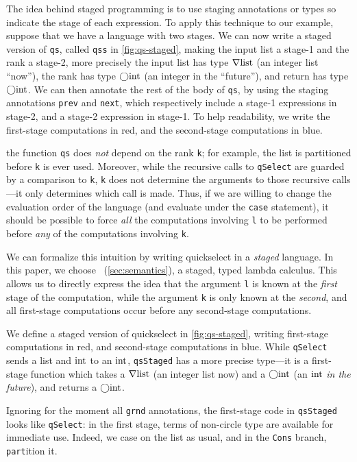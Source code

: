 \begin{abstrsyn}
The idea behind staged programming is to use staging annotations or
types so indicate the stage of each expression.  To apply this
technique to our example, suppose that we have a language with two
stages.  We can now write a staged version of \texttt{qs}, called
\texttt{qss} in \ref{fig:qs-staged}, making the input list a stage-1
and the rank a stage-2, more precisely the input list has type
$\nabla\mathrm{list}$ (an integer list ``now''), the rank has type
$\bigcirc{\rm int}$ (an integer in the ``future''), and return has type
$\bigcirc{\rm int}$.  We can then annotate the rest of the body of
\texttt{qs}, by using the staging annotations \texttt{prev} and
\texttt{next}, which respectively include a stage-1 expressions in
stage-2, and a stage-2 expression in stage-1.  To help readability, we
write the first-stage computations in red, and the second-stage
computations in blue.



the
function \texttt{qs} does \emph{not} depend on the rank \texttt{k};
for example, the list is partitioned before \texttt{k} is ever
used. Moreover, while the recursive calls to \texttt{qSelect} are
guarded by a comparison to \texttt{k}, \texttt{k} does not determine
the arguments to those recursive calls---it only determines which call
is made. Thus, if we are willing to change the evaluation order of the
language (and evaluate under the \texttt{case} statement), it should
be possible to force \emph{all} the computations involving \texttt{l}
to be performed before \emph{any} of the computations involving
\texttt{k}.

We can formalize this intuition by writing quickselect in a \emph{staged}
language. In this paper, we choose \lang\ (\ref{sec:semantics}), a staged, typed
lambda calculus. This allows us to directly express the idea that the argument
\texttt{l} is known at the \emph{first} stage of the computation, while the
argument \texttt{k} is only known at the \emph{second}, and all
first-stage computations occur before any second-stage computations.

We define a staged version of quickselect in \ref{fig:qs-staged}, writing
first-stage computations in red, and second-stage computations in blue. While
\texttt{qSelect} sends a \textrm{list} and ${\rm int}$ to an ${\rm int}$,
\texttt{qsStaged} has a more precise type---it is a first-stage function which
takes a $\nabla\mathrm{list}$ (an integer list now) and a $\bigcirc{\rm int}$
(an ${\rm int}$ \emph{in the future}), and returns a $\bigcirc{\rm int}$.

Ignoring for the moment all \texttt{grnd} annotations, the first-stage code in
\texttt{qsStaged} looks like \texttt{qSelect}: in the first stage, terms of
non-circle type are available for immediate use. Indeed, we case on the list as
usual, and in the \texttt{Cons} branch, \texttt{part}ition it.


\end{abstrsyn}
